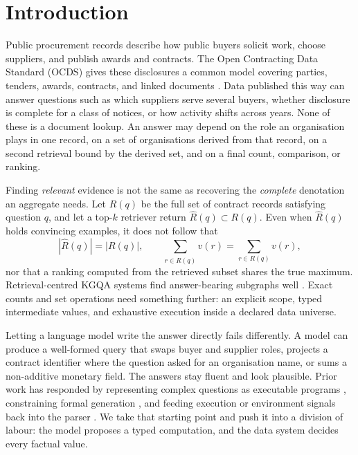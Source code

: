 \section{Introduction}
\label{sec:introduction}

Public procurement records describe how public buyers solicit work, choose suppliers, and publish
awards and contracts.  The Open Contracting Data Standard (OCDS) gives these disclosures a common
model covering parties, tenders, awards, contracts, and linked documents \citep{ocds-standard}.
Data published this way can answer questions such as which suppliers serve several buyers,
whether disclosure is complete for a class of notices, or how activity shifts across years.  None
of these is a document lookup.  An answer may depend on the role an organisation plays in one
record, on a set of organisations derived from that record, on a second retrieval bound by the
derived set, and on a final count, comparison, or ranking.

Finding \emph{relevant} evidence is not the same as recovering the \emph{complete} denotation an
aggregate needs.  Let $R(q)$ be the full set of contract records satisfying question $q$, and let
a top-$k$ retriever return $\widehat{R}(q)\subset R(q)$.  Even when $\widehat{R}(q)$ holds
convincing examples, it does not follow that
\begin{equation}
 |\widehat{R}(q)|=|R(q)|, \qquad
 \sum_{r\in\widehat{R}(q)}v(r)=\sum_{r\in R(q)}v(r),
 \label{eq:retrieval-not-aggregation}
\end{equation}
nor that a ranking computed from the retrieved subset shares the true maximum.  Retrieval-centred
KGQA systems find answer-bearing subgraphs well \citep{sun-etal-2019-pullnet, jiang2023unikgqa,
luo2024rog}.  Exact counts and set operations need something further: an explicit scope, typed
intermediate values, and exhaustive execution inside a declared data universe.

Letting a language model write the answer directly fails differently.  A model can produce a
well-formed query that swaps buyer and supplier roles, projects a contract identifier where the
question asked for an organisation name, or sums a non-additive monetary field.  The answers stay
fluent and look plausible.  Prior work has responded by representing complex questions as
executable programs \citep{cao-etal-2022-kqa, wolfson-etal-2020-break}, constraining formal
generation \citep{scholak-etal-2021-picard, shu-etal-2022-tiara}, and feeding execution or
environment signals back into the parser \citep{chen-etal-2021-retrack,
huang-etal-2024-queryagent}.  We take that starting point and push it into a division of labour:
the model proposes a typed computation, and the data system decides every factual value.

